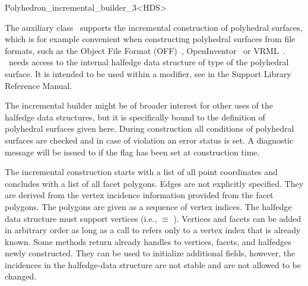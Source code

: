 
\ccRefPageBegin



\begin{ccRefClass}{Polyhedron_incremental_builder_3<HDS>}
\label{pagePolyIncrBuilder}

\ccDefinition
{}
  
The auxiliary class \ccClassTemplateName\ supports the incremental
construction of polyhedral surfaces, which is for example convenient
when constructing polyhedral surfaces from file formats, such as the
Object File Format (OFF)~\cite{cgal:p-gmgv16-96},
OpenInventor~\cite{cgal:w-impoo-94} or 
VRML~\cite{cgal:bpp-vrml-95,cgal:vrmls-96}.
\ccClassTemplateName\ needs access to the internal halfedge data
structure of type  of the polyhedral surface. It is intended
to be used within a modifier, see  in the 
Support Library Reference Manual.

The incremental builder might be of broader interest for other uses of
the halfedge data structures, but it is specifically bound to the
definition of polyhedral surfaces given here. During construction all
conditions of polyhedral surfaces are checked and in case of violation
an error status is set. A diagnostic message will be issued to
 if the  flag has been set at construction
time.

The incremental construction starts with a list of all point
coordinates and concludes with a list of all facet polygons. Edges are
not explicitly specified. They are derived from the vertex incidence
information provided from the facet polygons. The polygons are given as a
sequence of vertex indices.  The halfedge data structure  must
support vertices (i.e.,  $\equiv$
). Vertices and facets can be added in arbitrary order
as long as a call to  refers only to a
vertex index that is already known. Some methods return already
handles to vertices, facets, and halfedges newly constructed. They can
be used to initialize additional fields, however, the incidences in
the halfedge-data structure are not stable and are not allowed to be
changed.


\end{ccRefClass}
